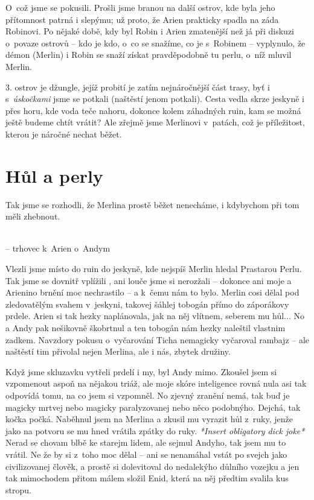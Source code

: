 \documentclass[a4paper,twocolumn,openany,nodeprecatedcode, justified]{dndbook}
\begin{document}
	O~což jsme se pokusili. Prošli jsme branou na další ostrov, kde byla jeho přítomnost patrná i slepýmu; už proto, že Arien prakticky spadla na záda Robinovi. Po nějaké době, kdy byl Robin i Arien zmatenější než já při diskuzi o~povaze ostrovů -- kdo je kdo, o~co se snažíme, co je s~Robinem -- vyplynulo, že démon (Merlin) i Robin se snaží získat pravděpodobně tu perlu, o~níž mluvil Merlin.
	
	3. ostrov je džungle, jejíž probití je zatím nejnáročnější část trasy, byť i s~\emph{úskočkami} jsme se potkali (naštěstí jenom potkali). Cesta vedla skrze jeskyně i přes horu, kde voda teče nahoru, dokonce kolem záhadných ruin, kam se možná ještě budeme chtít vrátit? Ale zřejmě jsme Merlinovi v~patách, což je příležitost, kterou je náročné nechat běžet.
	
	\section[Sezení 5]{Hůl a perly}
	Tak jsme se rozhodli, že Merlina prostě běžet nenecháme, i kdybychom při tom měli zhebnout.
	\begin{DndReadAloud}
		\sffamily
		\\
		-- trhovec k~Arien o~Andym
	\end{DndReadAloud}
	Vlezli jsme místo do ruin do jeskyně, kde nejspíš Merlin hledal Prastarou Perlu.  Tak jsme se dovnitř vplížili , ani louče jsme si nerozžali -- dokonce ani moje a Arienino brnění moc nechrastilo -- a k~čemu nám to bylo. Merlin cosi dělal pod zledovatělým svahem v~jeskyni, takovej šáhlej tobogán přímo do záporákovy prdele. Arien si tak hezky naplánovala, jak na něj vlítnem, seberem mu hůl... No a Andy pak nešikovně škobrtnul a ten tobogán nám hezky naleštil vlastnim zadkem. Navzdory pokusu o~vyčarování Ticha nemagicky vyčaroval rambajz -- ale naštěstí tim přivolal nejen Merlina, ale i nás, zbytek družiny.
	
	Když jsme skluzavku vytřeli prdelí i my, byl Andy mimo. Zkoušel jsem si vzpomenout aspoň na nějakou triáž, ale moje skóre inteligence rovná nula asi tak odpovídá tomu, na co jsem si vzpomněl. No zjevný zranění nemá, tak buď je magicky mrtvej nebo magicky paralyzovanej nebo něco podobnýho. Dejchá, tak kočka počká. Naběhnul jsem na Merlina a zkusil mu vyrazit hůl z~ruky, jenže jako na potvoru se mu hned vrátila zpátky do ruky. \emph{*Insert obligatory dick joke*} Nerad se chovam blbě ke starejm lidem, ale sejmul Andyho, tak jsem mu to vrátil. Ne že by si z~toho moc dělal -- ani se nenamáhal vstát po svejch jako civilizovanej člověk, a prostě si dolevitoval do nedalekýho důlního vozejku a jen tak mimochodem přitom málem složil Enid, která na něj předtim svalila kus stropu.
	
\end{document}
